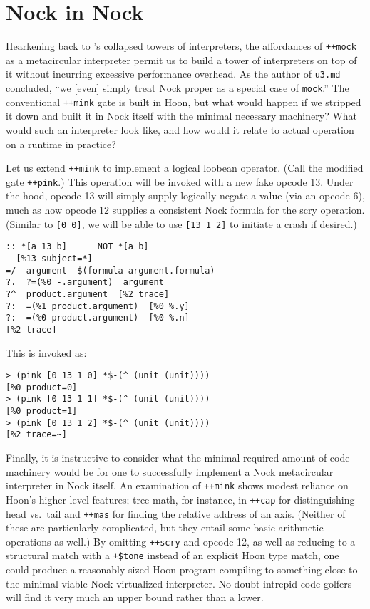 \documentclass[twoside]{article}
\begin{document}
\section{Nock in Nock}

Hearkening back to \citet{Amin2017}'s collapsed towers of interpreters, the affordances of \lstinline[style=inlinecode]{++mock} as a metacircular interpreter permit us to build a tower of interpreters on top of it without incurring excessive performance overhead.  As the author of \texttt{u3.md} concluded, ``we [even] simply treat Nock proper as a special case of \lstinline[style=inlinecode]{mock}.''  The conventional \lstinline[style=inlinecode]{++mink} gate is built in Hoon, but what would happen if we stripped it down and built it in Nock itself with the minimal necessary machinery?  What would such an interpreter look like, and how would it relate to actual operation on a runtime in practice?

Let us extend \lstinline[style=inlinecode]{++mink} to implement a logical loobean operator.  (Call the modified gate \lstinline[style=inlinecode]{++pink}.)  This operation will be invoked with a new fake opcode 13.  Under the hood, opcode 13 will simply supply logically negate a value (via an opcode 6), much as how opcode 12 supplies a consistent Nock formula for the scry operation.  (Similar to \lstinline[style=inlinecode]{[0 0]}, we will be able to use \lstinline[style=inlinecode]{[13 1 2]} to initiate a crash if desired.)

\begin{lstlisting}[style=listingcode]
:: *[a 13 b]      NOT *[a b]
  [%13 subject=*]
=/  argument  $(formula argument.formula)
?.  ?=(%0 -.argument)  argument
?^  product.argument  [%2 trace]
?:  =(%1 product.argument)  [%0 %.y]
?:  =(%0 product.argument)  [%0 %.n]
[%2 trace]
\end{lstlisting}

This is invoked as:

\begin{lstlisting}[style=listingcode]
> (pink [0 13 1 0] *$-(^ (unit (unit))))
[%0 product=0]
> (pink [0 13 1 1] *$-(^ (unit (unit))))
[%0 product=1]
> (pink [0 13 1 2] *$-(^ (unit (unit))))
[%2 trace=~]
\end{lstlisting}

Finally, it is instructive to consider what the minimal required amount of code machinery would be for one to successfully implement a Nock metacircular interpreter in Nock itself.  An examination of \lstinline[style=inlinecode]{++mink} shows modest reliance on Hoon's higher-level features; tree math, for instance, in \lstinline[style=inlinecode]{++cap} for distinguishing head vs.\ tail and \lstinline[style=inlinecode]{++mas} for finding the relative address of an axis.  (Neither of these are particularly complicated, but they entail some basic arithmetic operations as well.)  By omitting \lstinline[style=inlinecode]{++scry} and opcode 12, as well as reducing to a structural match with a \lstinline[style=inlinecode]{+$tone} instead of an explicit Hoon type match, one could produce a reasonably sized Hoon program compiling to something close to the minimal viable Nock virtualized interpreter.  No doubt intrepid code golfers will find it very much an upper bound rather than a lower.
\end{document}

